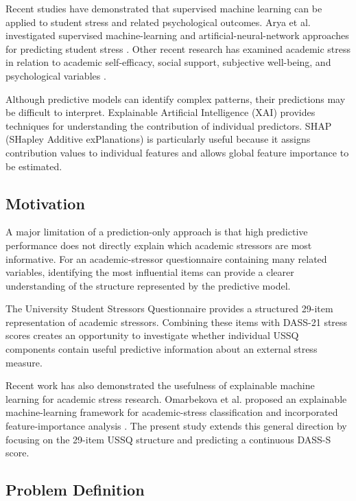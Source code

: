 \documentclass[conference]{IEEEtran}
\begin{document}
Recent studies have demonstrated that supervised machine learning can be applied to student stress and related psychological outcomes. Arya et al. investigated supervised machine-learning and artificial-neural-network approaches for predicting student stress \cite{arya2024}. Other recent research has examined academic stress in relation to academic self-efficacy, social support, subjective well-being, and psychological variables \cite{berlian2026,ouyang2026,zeng2025}.

Although predictive models can identify complex patterns, their predictions may be difficult to interpret. Explainable Artificial Intelligence (XAI) provides techniques for understanding the contribution of individual predictors. SHAP (SHapley Additive exPlanations) is particularly useful because it assigns contribution values to individual features and allows global feature importance to be estimated.

\subsection{Motivation}

A major limitation of a prediction-only approach is that high predictive performance does not directly explain which academic stressors are most informative. For an academic-stressor questionnaire containing many related variables, identifying the most influential items can provide a clearer understanding of the structure represented by the predictive model.

The University Student Stressors Questionnaire provides a structured 29-item representation of academic stressors. Combining these items with DASS-21 stress scores creates an opportunity to investigate whether individual USSQ components contain useful predictive information about an external stress measure.

Recent work has also demonstrated the usefulness of explainable machine learning for academic stress research. Omarbekova et al. proposed an explainable machine-learning framework for academic-stress classification and incorporated feature-importance analysis \cite{omarbekova2026}. The present study extends this general direction by focusing on the 29-item USSQ structure and predicting a continuous DASS-S score.

\subsection{Problem Definition}
\end{document}
